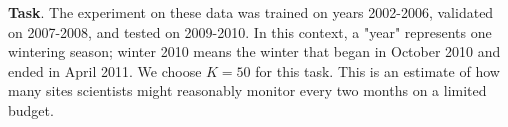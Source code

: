 






\textbf{Task}. The experiment on these data was trained on years 2002-2006, validated on 2007-2008, and tested on 2009-2010. In this context, a "year" represents one wintering season; winter 2010 means the winter that began in October 2010 and ended in April 2011.
We choose $K=50$ for this task. This is an estimate of how many sites scientists might reasonably monitor every two months on a limited budget.


